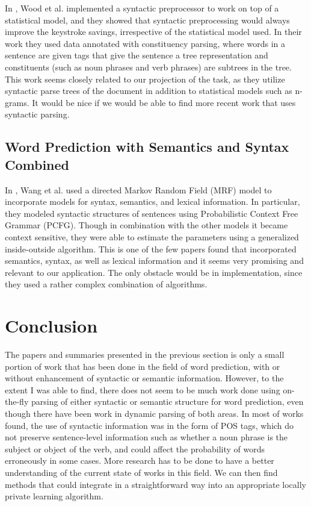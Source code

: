 \documentclass[14pt, oneside]{article}   	%
\begin{document}
In \cite{wood1996windmill},
Wood et al. implemented a syntactic preprocessor to work on top of a statistical model,
and they showed that syntactic preprocessing would always improve the keystroke savings,
irrespective of the statistical model used.
In their work they used data annotated with constituency parsing,
where words in a sentence are given tags that give the sentence a tree representation
and constituents (such as noun phrases and verb phrases) are subtrees in the tree.
This work seems closely related to our projection of the task,
as they utilize syntactic parse trees of the document in addition to statistical models
such as n-grams.
It would be nice if we would be able to find more recent work that uses syntactic parsing.\\

\subsection{Word Prediction with Semantics and Syntax Combined}
In \cite{wang2005exploiting},
Wang et al. used a directed Markov Random Field (MRF) model
to incorporate models for syntax, semantics, and lexical information.
In particular, they modeled syntactic structures of sentences using
Probabilistic Context Free Grammar (PCFG).
Though in combination with the other models it became context sensitive,
they were able to estimate the parameters using a generalized inside-outside algorithm.
This is one of the few papers found that incorporated semantics, syntax, as well as lexical information
and it seems very promising and relevant to our application.
The only obstacle would be in implementation, since they used a rather complex combination of algorithms.
%
%
%
%
%
%
%
%
%
\section{Conclusion}
The papers and summaries presented in the previous section is only a small portion of
work that has been done in the field of word prediction,
with or without enhancement of syntactic or semantic information.
However, to the extent I was able to find,
there does not seem to be much work done using on-the-fly parsing of
either syntactic or semantic structure for word prediction,
even though there have been work in dynamic parsing of both areas.
In most of works found, the use of syntactic information was in the form of POS tags,
which do not preserve sentence-level information
such as whether a noun phrase is the subject or object of the verb,
and could affect the probability of words erroneously in some cases.
More research has to be done to have a better understanding of the current state of works in this field.
We can then find methods that could integrate in a straightforward way
into an appropriate locally private learning algorithm.
%
%
%
%
%
%    
%
%
%
%
%
%
% 
%
%
%
%
%
%
%
%
%
%
%
%
%
%
%
%



%
\end{document}
